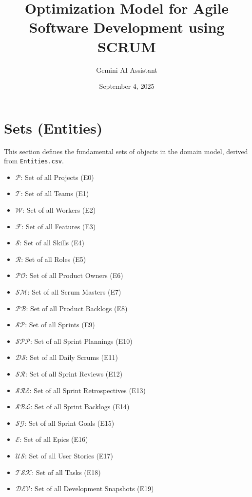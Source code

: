 \documentclass[11pt, a4paper]{article}
\title{Optimization Model for Agile Software Development using SCRUM}
\author{Gemini AI Assistant}
\date{September 4, 2025}
\begin{document}
\maketitle
\thispagestyle{empty}

\newpage
\tableofcontents
\thispagestyle{empty}

\newpage
\section{Sets (Entities)}
\setcounter{page}{1}
This section defines the fundamental sets of objects in the domain model, derived from \texttt{Entities.csv}.

\begin{itemize}
    \item $\mathcal{P}$: Set of all Projects (E0)
    \item $\mathcal{T}$: Set of all Teams (E1)
    \item $\mathcal{W}$: Set of all Workers (E2)
    \item $\mathcal{F}$: Set of all Features (E3)
    \item $\mathcal{S}$: Set of all Skills (E4)
    \item $\mathcal{R}$: Set of all Roles (E5)
    \item $\mathcal{PO}$: Set of all Product Owners (E6)
    \item $\mathcal{SM}$: Set of all Scrum Masters (E7)
    \item $\mathcal{PB}$: Set of all Product Backlogs (E8)
    \item $\mathcal{SP}$: Set of all Sprints (E9)
    \item $\mathcal{SPP}$: Set of all Sprint Plannings (E10)
    \item $\mathcal{DS}$: Set of all Daily Scrums (E11)
    \item $\mathcal{SR}$: Set of all Sprint Reviews (E12)
    \item $\mathcal{SRE}$: Set of all Sprint Retrospectives (E13)
    \item $\mathcal{SBL}$: Set of all Sprint Backlogs (E14)
    \item $\mathcal{SG}$: Set of all Sprint Goals (E15)
    \item $\mathcal{E}$: Set of all Epics (E16)
    \item $\mathcal{US}$: Set of all User Stories (E17)
    \item $\mathcal{TSK}$: Set of all Tasks (E18)
    \item $\mathcal{DEV}$: Set of all Development Snapshots (E19)

\end{itemize}
\end{document}

